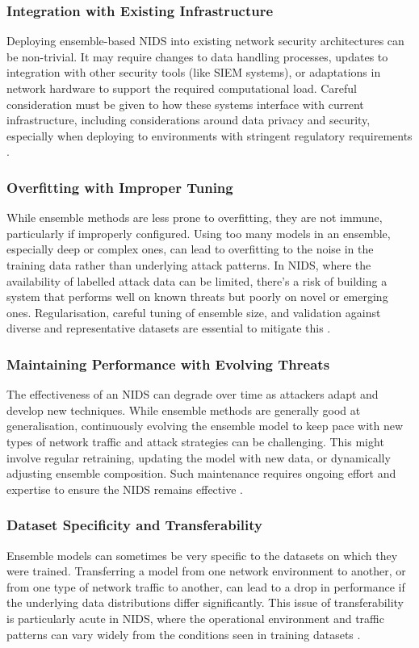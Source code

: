 \subsubsection{Integration with Existing Infrastructure} 
Deploying ensemble-based NIDS into existing network security architectures can be non-trivial. It may require changes to data handling processes, updates to integration with other security tools (like SIEM systems), or adaptations in network hardware to support the required computational load. Careful consideration must be given to how these systems interface with current infrastructure, including considerations around data privacy and security, especially when deploying to environments with stringent regulatory requirements \parencite{albanese2021integrating}.

\subsubsection{Overfitting with Improper Tuning} 
While ensemble methods are less prone to overfitting, they are not immune, particularly if improperly configured. Using too many models in an ensemble, especially deep or complex ones, can lead to overfitting to the noise in the training data rather than underlying attack patterns. In NIDS, where the availability of labelled attack data can be limited, there's a risk of building a system that performs well on known threats but poorly on novel or emerging ones. Regularisation, careful tuning of ensemble size, and validation against diverse and representative datasets are essential to mitigate this \parencite{gautam2021overfitting}.

\subsubsection{Maintaining Performance with Evolving Threats} 
The effectiveness of an NIDS can degrade over time as attackers adapt and develop new techniques. While ensemble methods are generally good at generalisation, continuously evolving the ensemble model to keep pace with new types of network traffic and attack strategies can be challenging. This might involve regular retraining, updating the model with new data, or dynamically adjusting ensemble composition. Such maintenance requires ongoing effort and expertise to ensure the NIDS remains effective \parencite{khan2021ensemble}.

\subsubsection{Dataset Specificity and Transferability} 
Ensemble models can sometimes be very specific to the datasets on which they were trained. Transferring a model from one network environment to another, or from one type of network traffic to another, can lead to a drop in performance if the underlying data distributions differ significantly. This issue of transferability is particularly acute in NIDS, where the operational environment and traffic patterns can vary widely from the conditions seen in training datasets \parencite{wang2023transferability}.

